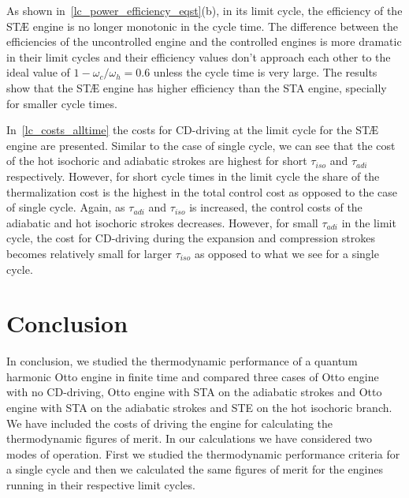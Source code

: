 \documentclass[aps,pra,twocolumn,showpacs,showkeys,groupedaddress,nobalancelastpage,nofootinbib,floatfix,superscriptaddress,longbibliography]{revtex4-2}
\begin{document}
As  shown in~\cref{lc_power_efficiency_eqst}(b), in its limit cycle, the efficiency of the ST{\AE} engine is no longer monotonic in the cycle time. The difference between the efficiencies of the uncontrolled engine and the controlled engines is more dramatic in their limit cycles and their efficiency values don't approach each other to the ideal value of $1-\omega_c/\omega_h=0.6$ unless the cycle time is very large. The results show that the ST{\AE} engine has higher efficiency than the STA engine, specially for smaller cycle times.

In~\cref{lc_costs_alltime} the costs for CD-driving at the limit cycle for the ST{\AE} engine are presented. Similar to the case of single cycle, we can see that the cost of the hot isochoric and adiabatic strokes are highest for short $\tau_{iso}$ and $\tau_{adi}$ respectively. However, for short cycle times in the limit cycle the share of the thermalization cost is the highest in the total control cost as opposed to the case of single cycle. Again, as $\tau_{adi}$ and $\tau_{iso}$ is increased, the control costs of the adiabatic and hot isochoric strokes decreases. However, for small $\tau_{adi}$ in the limit cycle, the cost for CD-driving during the expansion and compression strokes becomes relatively small for larger $\tau_{iso}$ as opposed to what we see for a single cycle.

\section{Conclusion}
\label{sec:conclusion}
In conclusion, we studied the thermodynamic performance of a quantum harmonic Otto engine in finite time and compared three cases of Otto engine with no CD-driving, Otto engine with STA on the adiabatic strokes and Otto engine with STA on the adiabatic strokes and STE on the hot isochoric branch. We have included the costs of driving the engine for calculating the thermodynamic figures of merit. In our calculations we have considered two modes of operation. First we studied the thermodynamic performance criteria for a single cycle and then we calculated the same figures of merit for the engines running
in their respective limit cycles.\\
\end{document}
